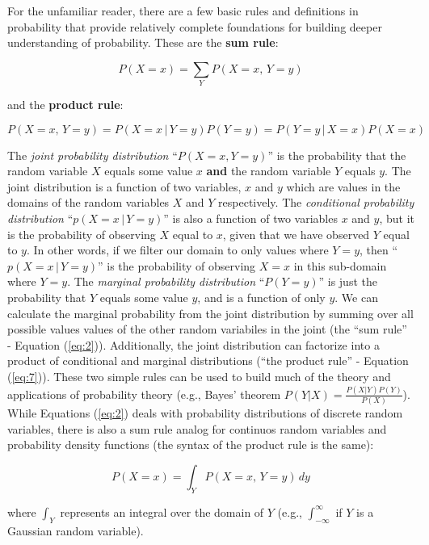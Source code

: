 \documentclass[12pt]{article}
\begin{document}
For the unfamiliar reader, there are a few basic rules and definitions
in probability that provide relatively complete foundations for
building deeper understanding of probability. These are the \textbf{sum rule}:

\begin{equation}
  P(X=x) = \sum_Y P(X=x,\, Y=y)
  \label{eq:2}
\end{equation}

and the \textbf{product rule}:

\begin{equation}
  P(X=x, \, Y=y) = P(X = x \, | \, Y=y ) P(Y=y) = P(Y = y \, | \, X=x ) P(X=x)
  \label{eq:7}
\end{equation}

The \textit{joint probability distribution} ``$P(X=x,Y=y)$'' is the
probability that the random variable $X$ equals some value $x$
\textbf{and} the random variable $Y$ equals $y$. The joint
distribution is a function of two variables, $x$ and $y$ which are
values in the domains of the random variables $X$ and $Y$
respectively. The \textit{conditional probability distribution}
``$p(X = x \, | \, Y=y )$'' is also a function of two variables $x$
and $y$, but it is the probability of observing $X$ equal to $x$,
given that we have observed $Y$ equal to $y$. In other words, if we
filter our domain to only values where $Y=y$, then
``$p(X = x \, | \, Y=y )$'' is the probability of observing $X=x$ in
this sub-domain where $Y=y$. The \textit{marginal probability
  distribution} ``$P(Y=y)$'' is just the probability that $Y$ equals
some value $y$, and is a function of only $y$. We can calculate the
marginal probability from the joint distribution by summing over all
possible values values of the other random variabiles in the joint
(the ``sum rule'' - Equation (\ref{eq:2})). Additionally, the joint
distribution can factorize into a product of conditional and marginal
distributions (``the product rule'' - Equation (\ref{eq:7})). These
two simple rules can be used to build much of the theory and
applications of probability theory (e.g., Bayes' theorem
$P(Y|X) =\frac{P(X|Y) P(Y)}{P(X)}$). While Equations (\ref{eq:2})
deals with probability distributions of discrete random variables,
there is also a sum rule analog for continuos random variables and
probability density functions (the syntax of the product rule is the
same):

\begin{equation*}
  P(X=x) = \int_Y P(X=x,\, Y=y) \, dy
  \label{eq:2}
\end{equation*}

where $\int_{Y}$ represents an integral over the domain of $Y$ (e.g.,
$\int_{-\infty}^{\infty}$ if $Y$ is a Gaussian random variable).
\end{document}
